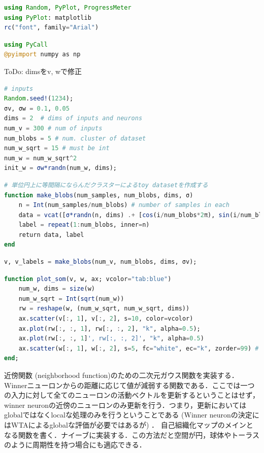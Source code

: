 \begin{lstlisting}[language=julia]
using Random, PyPlot, ProgressMeter
using PyPlot: matplotlib
rc("font", family="Arial")
\end{lstlisting}
\begin{lstlisting}[language=julia]
using PyCall
@pyimport numpy as np
\end{lstlisting}
ToDo: dimsをv, wで修正
\begin{lstlisting}[language=julia]
# inputs 
Random.seed!(1234);
σv, σw = 0.1, 0.05
dims = 2  # dims of inputs and neurons
num_v = 300 # num of inputs
num_blobs = 5 # num. cluster of dataset 
num_w_sqrt = 15 # must be int
num_w = num_w_sqrt^2
init_w = σw*randn(num_w, dims);
\end{lstlisting}
\begin{lstlisting}[language=julia]
# 単位円上に等間隔にならんだクラスターによるtoy datasetを作成する
function make_blobs(num_samples, num_blobs, dims, σ)
    n = Int(num_samples/num_blobs) # number of samples in each 
    data = vcat([σ*randn(n, dims) .+ [cos(i/num_blobs*2π), sin(i/num_blobs*2π)]' for i in 0:num_blobs-1]...)
    label = repeat(1:num_blobs, inner=n)
    return data, label
end
\end{lstlisting}
\begin{lstlisting}[language=julia]
v, v_labels = make_blobs(num_v, num_blobs, dims, σv);
\end{lstlisting}
\begin{lstlisting}[language=julia]
function plot_som(v, w, ax; vcolor="tab:blue")
    num_w, dims = size(w)
    num_w_sqrt = Int(sqrt(num_w))
    rw = reshape(w, (num_w_sqrt, num_w_sqrt, dims))
    ax.scatter(v[:, 1], v[:, 2], s=10, color=vcolor)
    ax.plot(rw[:, :, 1], rw[:, :, 2], "k", alpha=0.5); 
    ax.plot(rw[:, :, 1]', rw[:, :, 2]', "k", alpha=0.5)
    ax.scatter(w[:, 1], w[:, 2], s=5, fc="white", ec="k", zorder=99) # w[i, j, 1]とw[i, j, 2]の点をプロット
end;
\end{lstlisting}
近傍関数 (neighborhood function)のための二次元ガウス関数を実装する．Winnerニューロンからの距離に応じて値が減弱する関数である．ここでは一つの入力に対して全てのニューロンの活動ベクトルを更新するということはせず，winner neuronの近傍のニューロンのみ更新を行う．つまり，更新においてはglobalではなくlocalな処理のみを行うということである  (Winner neuronの決定にはWTAによるglobalな評価が必要ではあるが) ．
自己組織化マップのメインとなる関数を書く．ナイーブに実装する．この方法だと空間が円，球体やトーラスのように周期性を持つ場合にも適応できる．
